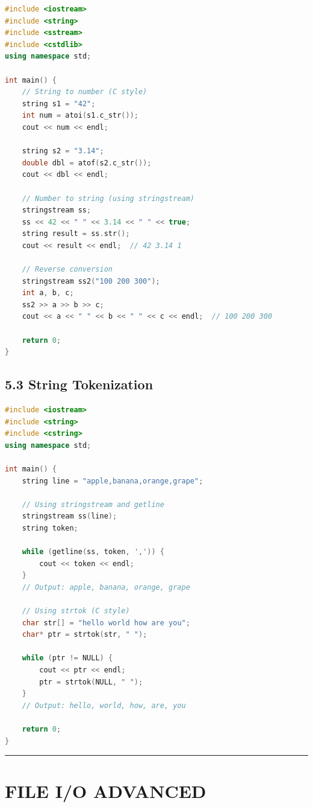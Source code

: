 \begin{lstlisting}[language={C++}]
#include <iostream>
#include <string>
#include <sstream>
#include <cstdlib>
using namespace std;

int main() {
    // String to number (C style)
    string s1 = "42";
    int num = atoi(s1.c_str());
    cout << num << endl;
    
    string s2 = "3.14";
    double dbl = atof(s2.c_str());
    cout << dbl << endl;
    
    // Number to string (using stringstream)
    stringstream ss;
    ss << 42 << " " << 3.14 << " " << true;
    string result = ss.str();
    cout << result << endl;  // 42 3.14 1
    
    // Reverse conversion
    stringstream ss2("100 200 300");
    int a, b, c;
    ss2 >> a >> b >> c;
    cout << a << " " << b << " " << c << endl;  // 100 200 300
    
    return 0;
}
\end{lstlisting}

\hypertarget{string-tokenization}{%
\section{5.3 String Tokenization}\label{string-tokenization}}

\begin{lstlisting}[language={C++}]
#include <iostream>
#include <string>
#include <cstring>
using namespace std;

int main() {
    string line = "apple,banana,orange,grape";
    
    // Using stringstream and getline
    stringstream ss(line);
    string token;
    
    while (getline(ss, token, ',')) {
        cout << token << endl;
    }
    // Output: apple, banana, orange, grape
    
    // Using strtok (C style)
    char str[] = "hello world how are you";
    char* ptr = strtok(str, " ");
    
    while (ptr != NULL) {
        cout << ptr << endl;
        ptr = strtok(NULL, " ");
    }
    // Output: hello, world, how, are, you
    
    return 0;
}
\end{lstlisting}

\begin{center}\rule{0.5\linewidth}{0.5pt}\end{center}

\hypertarget{file-io-advanced}{%
\chapter{FILE I/O ADVANCED}\label{file-io-advanced}}

